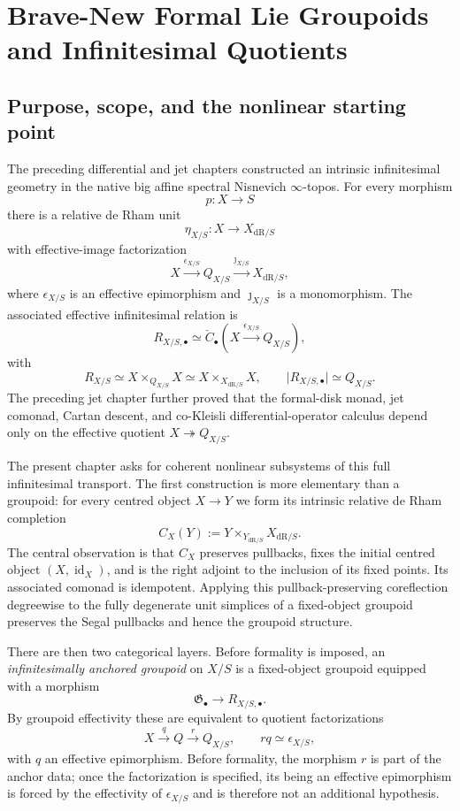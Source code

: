 \chapter{Brave-New Formal Lie Groupoids and Infinitesimal Quotients}
\label{ch:formal-lie-groupoids}


\section{Purpose, scope, and the nonlinear starting point}
\label{sec:flg-purpose}

The preceding differential and jet chapters constructed an intrinsic
infinitesimal geometry in the native big affine spectral Nisnevich
$\infty$-topos.  For every morphism
\[
    p:X\longrightarrow S
\]
there is a relative de Rham unit
\[
    \eta_{X/S}:X\longrightarrow X_{\mathrm{dR}/S}
\]
with effective-image factorization
\[
    X
    \xrightarrow{\epsilon_{X/S}}
    Q_{X/S}
    \xrightarrow{\jmath_{X/S}}
    X_{\mathrm{dR}/S},
\]
where $\epsilon_{X/S}$ is an effective epimorphism and
$\jmath_{X/S}$ is a monomorphism.  The associated effective
infinitesimal relation is
\[
    R_{X/S,\bullet}
    \simeq
    \check C_\bullet
    \left(
        X\xrightarrow{\epsilon_{X/S}}Q_{X/S}
    \right),
\]
with
\[
    R_{X/S}
    \simeq
    X\times_{Q_{X/S}}X
    \simeq
    X\times_{X_{\mathrm{dR}/S}}X,
    \qquad
    \lvert R_{X/S,\bullet}\rvert\simeq Q_{X/S}.
\]
The preceding jet chapter further proved that the formal-disk monad,
jet comonad, Cartan descent, and co-Kleisli differential-operator
calculus depend only on the effective quotient
$X\twoheadrightarrow Q_{X/S}$.

The present chapter asks for coherent nonlinear subsystems of this full
infinitesimal transport.  The first construction is more elementary than a
groupoid: for every centred object $X\to Y$ we form its intrinsic relative
de Rham completion
\[
    C_X(Y)
    :=
    Y\times_{Y_{\mathrm{dR}/S}}X_{\mathrm{dR}/S}.
\]
The central observation is that $C_X$ preserves pullbacks, fixes the
initial centred object $(X,\operatorname{id}_X)$, and is the right adjoint to
the inclusion of its fixed points.  Its associated comonad is idempotent.
Applying this pullback-preserving coreflection degreewise to the fully
degenerate unit simplices of a fixed-object groupoid preserves the Segal
pullbacks and hence the groupoid structure.

There are then two categorical layers.  Before formality is imposed, an
\emph{infinitesimally anchored groupoid} on $X/S$ is a fixed-object groupoid
equipped with a morphism
\[
    \mathfrak G_\bullet\longrightarrow R_{X/S,\bullet}.
\]
By groupoid effectivity these are equivalent to quotient factorizations
\[
    X\xrightarrow{q} Q\xrightarrow{r} Q_{X/S},
    \qquad
    rq\simeq\epsilon_{X/S},
\]
with $q$ an effective epimorphism.  Before formality, the morphism $r$ is
part of the anchor data; once the factorization is specified, its being an
effective epimorphism is forced by the effectivity of
$\epsilon_{X/S}$ and is therefore not an additional hypothesis.

